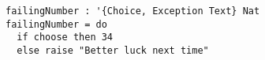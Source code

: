 \begin{algorithm}

\begin{verbatim}
failingNumber : '{Choice, Exception Text} Nat
failingNumber = do
  if choose then 34
  else raise "Better luck next time"
\end{verbatim}

\caption{Effect composition in Unison %
\label{alg-eff:composition}}
\end{algorithm}